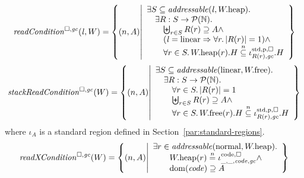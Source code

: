 \[
  \readCond{\lin,W} = \left\{ \npair{A} \middle| 
    \begin{array}{l}
      \exists S \subseteq \addressable{\lin, \pwheap} \ldotp \\
      \quad \exists R : S \fun \powerset{\nats} \ldotp\\
      \qquad \biguplus_{r\in S} R(r) \supseteq A \wedge\\
      \qquad (\lin = \linear \Rightarrow \forall r\ldotp |R(r)|  = 1) \wedge\\
      \qquad \forall r \in S \ldotp \pwheap(r).H \nsubeq \stdreg{R(r),\gc}{\pur}.H
    \end{array}
  \right\}
\]
\[
  \stackReadCond{W} = \left\{ \npair{A} \middle| 
    \begin{array}{l}
      \exists S \subseteq \addressable{\linear, \pwfree} \ldotp \\
      \quad \exists R : S \fun \powerset{\nats} \ldotp\\
      \qquad \forall r \in S \ldotp |R(r)| = 1\\
      \qquad \biguplus_{r\in S} R(r) \supseteq A \wedge \\
      \qquad \forall r \in S \ldotp \pwfree(r).H \nsubeq \stdreg{R(r),\gc}{\pur}.H
    \end{array}
  \right\}
\]
where $\iota_A$ is a standard region defined in Section~\ref{par:standard-regions}.
\[
  \xReadCond{W} = \left\{ \npair{A} \middle| 
    \begin{array}{l}
      \exists r \in \addressable{\normal, \pwheap} \ldotp \\
      \qquad \pwheap(r) \nequal \codereg{\_,\_,\code,\gc}\wedge\\
      \qquad \dom(\code) \supseteq A 
    \end{array}
  \right\}
\]

